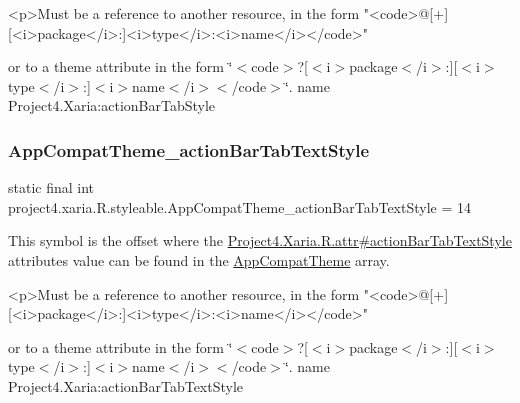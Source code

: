\begin{DoxyVerb}      <p>Must be a reference to another resource, in the form "<code>@[+][<i>package</i>:]<i>type</i>:<i>name</i></code>"
\end{DoxyVerb}
 or to a theme attribute in the form \char`\"{}$<$code$>$?\mbox{[}$<$i$>$package$<$/i$>$\+:\mbox{]}\mbox{[}$<$i$>$type$<$/i$>$\+:\mbox{]}$<$i$>$name$<$/i$>$$<$/code$>$\char`\"{}.  name Project4.\+Xaria\+:action\+Bar\+Tab\+Style \mbox{\label{classproject4_1_1xaria_1_1R_1_1styleable_ac76a4f213c72e9795418b8e7289f0feb}} 
\subsubsection{\texorpdfstring{App\+Compat\+Theme\+\_\+action\+Bar\+Tab\+Text\+Style}{AppCompatTheme\_actionBarTabTextStyle}}
{\footnotesize\ttfamily static final int project4.\+xaria.\+R.\+styleable.\+App\+Compat\+Theme\+\_\+action\+Bar\+Tab\+Text\+Style = 14\hspace{0.3cm}{\ttfamily [static]}}

This symbol is the offset where the \hyperlink{}{Project4.\+Xaria.\+R.\+attr\#action\+Bar\+Tab\+Text\+Style} attribute\textquotesingle{}s value can be found in the \hyperlink{classproject4_1_1xaria_1_1R_1_1styleable_aad8bec413e2350f9404e6ff0e831a85d}{App\+Compat\+Theme} array.

\begin{DoxyVerb}      <p>Must be a reference to another resource, in the form "<code>@[+][<i>package</i>:]<i>type</i>:<i>name</i></code>"
\end{DoxyVerb}
 or to a theme attribute in the form \char`\"{}$<$code$>$?\mbox{[}$<$i$>$package$<$/i$>$\+:\mbox{]}\mbox{[}$<$i$>$type$<$/i$>$\+:\mbox{]}$<$i$>$name$<$/i$>$$<$/code$>$\char`\"{}.  name Project4.\+Xaria\+:action\+Bar\+Tab\+Text\+Style \mbox{\label{classproject4_1_1xaria_1_1R_1_1styleable_a872840b3faa033949bb39c7e8ccf3802}} 
